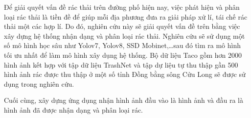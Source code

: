 \documentclass[./thesis.tex]{subfiles}
\begin{document}

{\fontsize{13}{12} \selectfont
Để giải quyết vấn đề rác thải trên đường phố hiện nay, việc phát hiện và phân loại rác thải là tiền đề để giúp mỗi địa phương đưa ra giải pháp xử lí, tái chế rác thải một các hợp lí. Do đó, nghiên cứu này sẽ giải quyết vấn đề trên bằng việc xây dựng hệ thống nhận dạng và phân loại rác thải. Nghiên cứu sẽ sử dụng một số mô hình học sâu như Yolov7, Yolov8, SSD Mobinet,\dots sau đó tìm ra mô hình tối ưu nhất để làm mô hình xây dụng hệ thống. Bộ dữ liệu Taco gồm hơn 2000 hình ảnh kết hợp với tập dữ liệu TrashNet và tập dự liệu tự thu thập gần 500 hình ảnh rác được thu thập ở một số tỉnh Đồng bằng sông Cửu Long sẽ được sử dụng trong nghiên cứu.


Cuối cùng, xây dựng ứng dụng nhận hình ảnh đầu vào là hình ảnh và đầu ra là hình ảnh đã được nhận dạng và phân loại rác.
}
\bigskip

\end{document}
